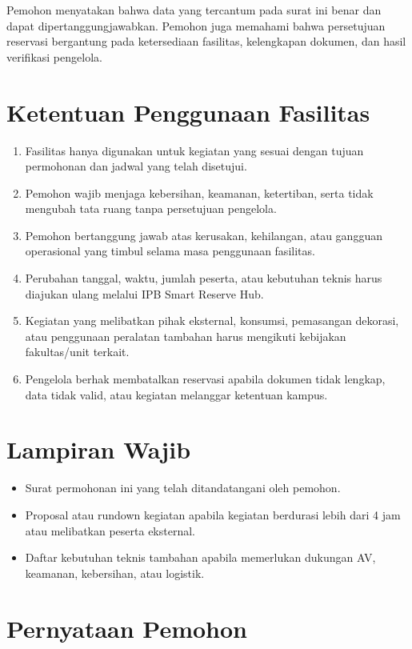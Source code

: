 \documentclass[11pt,a4paper]{article}
\begin{document}
Pemohon menyatakan bahwa data yang tercantum pada surat ini benar dan dapat dipertanggungjawabkan. Pemohon juga memahami bahwa persetujuan reservasi bergantung pada ketersediaan fasilitas, kelengkapan dokumen, dan hasil verifikasi pengelola.

\section*{Ketentuan Penggunaan Fasilitas}
\begin{enumerate}
  \item Fasilitas hanya digunakan untuk kegiatan yang sesuai dengan tujuan permohonan dan jadwal yang telah disetujui.
  \item Pemohon wajib menjaga kebersihan, keamanan, ketertiban, serta tidak mengubah tata ruang tanpa persetujuan pengelola.
  \item Pemohon bertanggung jawab atas kerusakan, kehilangan, atau gangguan operasional yang timbul selama masa penggunaan fasilitas.
  \item Perubahan tanggal, waktu, jumlah peserta, atau kebutuhan teknis harus diajukan ulang melalui IPB Smart Reserve Hub.
  \item Kegiatan yang melibatkan pihak eksternal, konsumsi, pemasangan dekorasi, atau penggunaan peralatan tambahan harus mengikuti kebijakan fakultas/unit terkait.
  \item Pengelola berhak membatalkan reservasi apabila dokumen tidak lengkap, data tidak valid, atau kegiatan melanggar ketentuan kampus.
\end{enumerate}

\section*{Lampiran Wajib}
\begin{itemize}
  \item Surat permohonan ini yang telah ditandatangani oleh pemohon.
  \item Proposal atau rundown kegiatan apabila kegiatan berdurasi lebih dari 4 jam atau melibatkan peserta eksternal.
  \item Daftar kebutuhan teknis tambahan apabila memerlukan dukungan AV, keamanan, kebersihan, atau logistik.
\end{itemize}

\section*{Pernyataan Pemohon}
\end{document}
